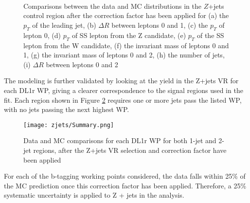 \begin{figure}[H]
    \\
    \\                                 
    \\
    \caption{Comparisons between the data and MC distributions in the $Z$+jets control region after the correction factor has been applied for (a) the $p_T$ of the leading jet, (b) $\Delta R$ between leptons 0 and 1, (c) the $p_T$ of lepton 0, (d) $p_T$ of SS lepton from the Z candidate, (e) $p_T$ of the SS lepton from the W candidate, (f) the invariant mass of leptons 0 and 1, (g) the invariant mass of leptons 0 and 2, (h) the number of jets, (i) $\Delta R$ between leptons 0 and 2}%
    \label{fig:zjets_withScale}
\end{figure}

The modeling is further validated by looking at the yield in the Z+jets VR for each DL1r WP, giving a clearer correspondence to the signal regions used in the fit. Each region shown in Figure \ref{fig:zjets_summary} requires one or more jets pass the listed WP, with no jets passing the next highest WP.                                                                    

                                                                                                                             
\begin{figure}[H]                                                                                                        
   \centering
   \texttt{[image: zjets/Summary.png]}
   \caption{Data and MC comparisons for each DL1r WP for both 1-jet and 2-jet regions, after the Z+jets VR selection and correction factor have been applied}                                                                                             
   \label{fig:zjets_summary}
\end{figure}

For each of the b-tagging working points considered, the data falls within 25\% of the MC prediction once this correction factor has been applied. Therefore, a 25\% systematic uncertainty is applied to Z + jets in the analysis.

